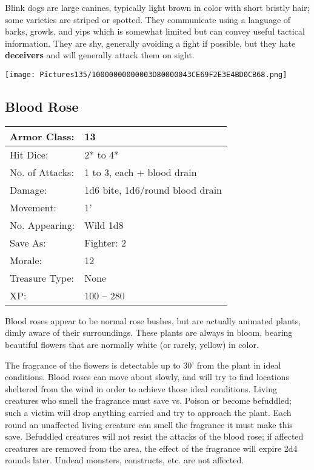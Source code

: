 \documentclass[a4paper,twoside,openany,10pt]{book}
\begin{document}
\begin{multicols}{2}
Blink dogs are large canines, typically light brown in color with short bristly hair; some varieties are striped or spotted. They communicate using a language of barks, growls, and yips which is somewhat limited but can convey useful tactical information. They are shy, generally avoiding a fight if possible, but they hate \textbf{deceivers} and will generally attack them on sight.


\begin{center}
	\texttt{[image: Pictures135/10000000000003D80000043CE69F2E3E4BD0CB68.png]}
\end{center}

\subsection*{Blood Rose}\label{blood-rose}

\begin{tabularx}{0.48\textwidth}{@{}lX@{}}
	Armor Class: & 13 \\\hline
Hit Dice: & 2* to 4* \\\hline
No. of Attacks: & 1 to 3, each + blood drain \\\hline
Damage: & 1d6 bite, 1d6/round blood drain \\\hline
Movement: & 1' \\\hline
No. Appearing: & Wild 1d8 \\\hline
Save As: & Fighter: 2 \\\hline
Morale: & 12 \\\hline
Treasure Type: & None \\\hline
XP: & 100 -- 280 \\\hline
\end{tabularx}\medskip

Blood roses appear to be normal rose bushes, but are actually animated plants, dimly aware of their surroundings. These plants are always in bloom, bearing beautiful flowers that are normally white (or rarely, yellow) in color.

The fragrance of the flowers is detectable up to 30' from the plant in ideal conditions. Blood roses can move about slowly, and will try to find locations sheltered from the wind in order to achieve those ideal conditions. Living creatures who smell the fragrance must save vs. Poison or become befuddled; such a victim will drop anything carried and try to approach the plant. Each round an unaffected living creature can smell the fragrance it must make this save. Befuddled creatures will not resist the attacks of the blood rose; if affected creatures are removed from the area, the effect of the fragrance will expire 2d4 rounds later. Undead monsters, constructs, etc. are not affected.


\end{multicols}
\end{document}
